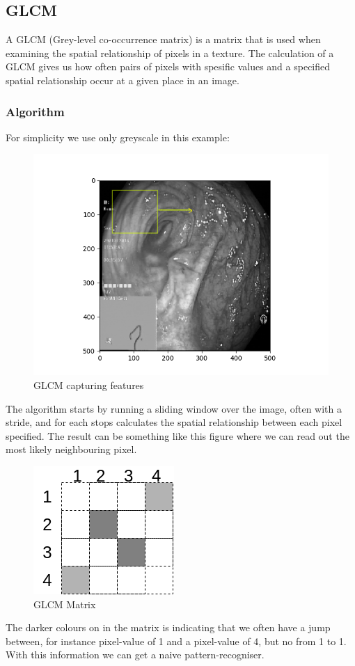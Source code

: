 	  
	  
	  \subsection{GLCM}
	    A GLCM (Grey-level co-occurrence matrix) is a matrix that is used when examining the spatial relationship of pixels in a texture. 
	    The calculation of a GLCM gives us how often pairs of pixels with spesific values and a specified spatial relationship occur at a given place in an image. %
	  
	    \subsubsection{Algorithm}
	      For simplicity we use only greyscale in this example:
	      \begin{figure}[h]
		\centering
		\includegraphics[scale=0.5]{figures/sliding_window_box.png}
		\caption{GLCM capturing features}
	      \end{figure}
	      The algorithm starts by running a sliding window over the image, often with a stride, and for each stops calculates the spatial relationship between each pixel specified.
	      The result can be something like this figure %
	      where we can read out the most likely neighbouring pixel.
	       \begin{figure}[h]
		\centering
		\includegraphics[scale=0.5]{figures/Simple_GLCM.png}
		\caption{GLCM Matrix}
	      \end{figure}
	      The darker colours on in the matrix is indicating that we often have a jump between, for instance pixel-value of 1 and a pixel-value of 4, but no from 1 to 1.\\
	      With this information we can get a naive pattern-recogniser. 
